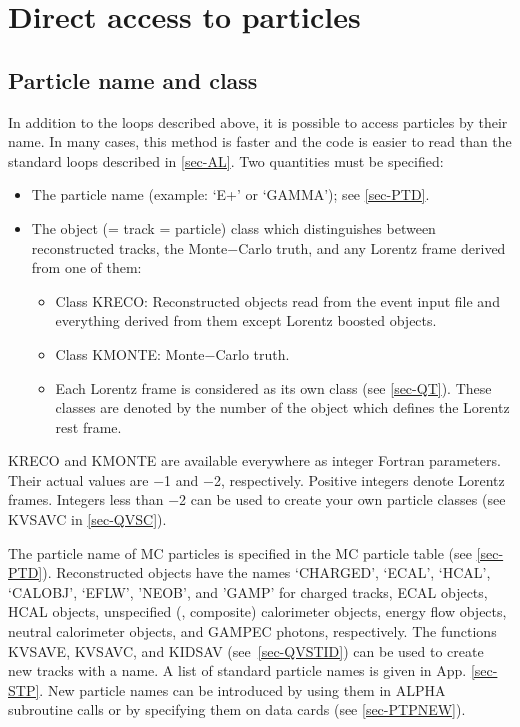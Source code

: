 \section{\label{sec-AD}Direct access to particles}
\par
\subsection{\label{sec-ADI}Particle name and class}
\par
In addition to the loops described above, it is possible to access
particles by
their name.
In many cases, this method is faster and the code is easier to read
than the
standard loops
described in \ref{sec-AL}.
Two quantities must be specified:
\begin{itemize}
\item The particle name (example: `E+' or `GAMMA'); see
\ref{sec-PTD}.
\item The object (= track = particle) class which distinguishes between
reconstructed tracks, the
Monte$-$Carlo truth, and any Lorentz frame derived from one of them:
\begin{itemize}
\item Class KRECO: Reconstructed objects read from the event input
file
and everything derived from
them except Lorentz boosted objects.
\item Class KMONTE: Monte$-$Carlo truth.
\item Each Lorentz frame is considered as its own class
(see \ref{sec-QT}).
These classes are denoted by the number of the object which defines
the Lorentz rest frame.
\end{itemize}
\end{itemize}
\par KRECO and KMONTE are
available
everywhere as integer Fortran parameters. Their actual values are
$-$1 and
$-$2, respectively. Positive integers denote Lorentz frames. Integers
less than $-$2 can be used to create your own particle classes
(see KVSAVC in \ref{sec-QVSC}).
\par
The particle name of MC particles is specified in the MC particle
table
(see \ref{sec-PTD}).
Reconstructed objects have the names `CHARGED', `ECAL',
`HCAL', `CALOBJ', `EFLW', 'NEOB', and 'GAMP'
 for charged tracks, ECAL objects, HCAL objects,
unspecified (\eg, composite) calorimeter objects,
energy flow objects, neutral calorimeter objects, and GAMPEC photons,
respectively.
The functions KVSAVE, KVSAVC, and KIDSAV (see~\ref{sec-QVSTID})
can be used to create new tracks with
a name.
A list of standard particle names is given in App. \ref{sec-STP}.
New particle names can be introduced by using them in ALPHA
subroutine calls or by specifying them on data cards (see
\ref{sec-PTPNEW}).
 

